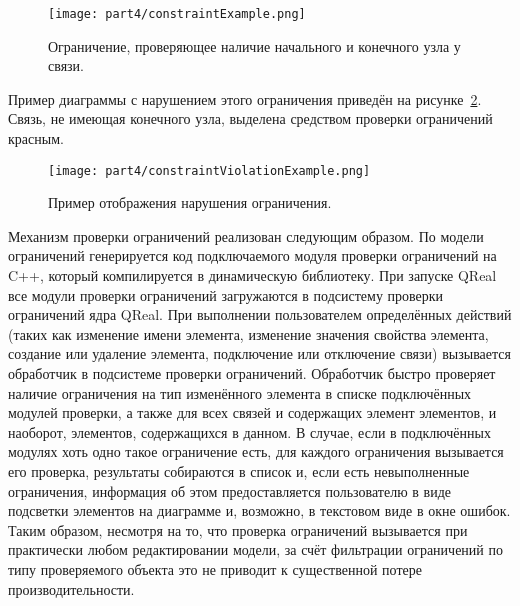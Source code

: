 \begin{figure} [ht]
	\begin{center}
		\texttt{[image: part4/constraintExample.png]}
		\caption{Ограничение, проверяющее наличие начального и конечного узла у связи.}
		\label{image:constraintExample}
	\end{center}
\end{figure}

Пример диаграммы с нарушением этого ограничения приведён на рисунке~\ref{image:constraintViolationExample}. 
Связь, не имеющая конечного узла, выделена средством проверки ограничений красным.

\begin{figure} [ht]
	\begin{center}
		\texttt{[image: part4/constraintViolationExample.png]}
		\caption{Пример отображения нарушения ограничения.}
		\label{image:constraintViolationExample}
	\end{center}
\end{figure}

Механизм проверки ограничений реализован следующим образом. По модели ограничений 
генерируется код подключаемого модуля проверки ограничений на C++, который компилируется 
в динамическую библиотеку. При запуске QReal все модули проверки ограничений загружаются 
в подсистему проверки ограничений ядра QReal. При выполнении пользователем определённых 
действий (таких как изменение имени элемента, изменение значения свойства элемента, 
создание или удаление элемента, подключение или отключение связи) вызывается обработчик 
в подсистеме проверки ограничений. Обработчик быстро проверяет наличие ограничения 
на тип изменённого элемента в списке подключённых модулей проверки, а также для всех 
связей и содержащих элемент элементов, и наоборот, элементов, содержащихся в данном. 
В случае, если в подключённых модулях хоть одно такое ограничение есть, для каждого 
ограничения вызывается его проверка, результаты собираются в список и, если есть невыполненные 
ограничения, информация об этом предоставляется пользователю в виде подсветки элементов 
на диаграмме и, возможно, в текстовом виде в окне ошибок. Таким образом, несмотря на то, 
что проверка ограничений вызывается при практически любом редактировании модели, за 
счёт фильтрации ограничений по типу проверяемого объекта это не приводит к существенной 
потере производительности.

